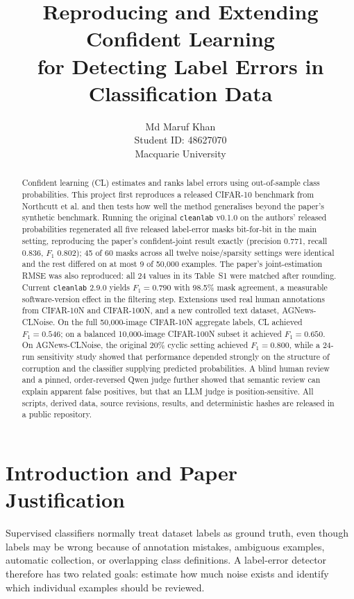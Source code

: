\documentclass[11pt]{article}
\title{Reproducing and Extending Confident Learning\\
for Detecting Label Errors in Classification Data}
\author{
  Md Maruf Khan \\
  Student ID: 48627070 \\
  Macquarie University
}
\newcommand{\cleanlab}{\texttt{cleanlab}}
\begin{document}
\maketitle

\begin{abstract}
Confident learning (CL) estimates and ranks label errors using out-of-sample
class probabilities. This project first reproduces a released CIFAR-10
benchmark from Northcutt et al. and then tests how well the method
generalises beyond the paper's synthetic benchmark. Running the original
\cleanlab{} v0.1.0 on the authors' released probabilities regenerated all
five released label-error masks bit-for-bit in the main setting, reproducing the paper's
confident-joint result exactly (precision 0.771, recall 0.836, $F_1$ 0.802);
45 of 60 masks across all twelve noise/sparsity settings were identical and
the rest differed on at most 9 of 50,000 examples. The paper's
joint-estimation RMSE was also reproduced: all 24 values in its
Table~S1 were matched after rounding. Current \cleanlab{}
2.9.0 yields $F_1=0.790$ with 98.5\% mask agreement, a measurable
software-version effect in the filtering step. Extensions used real human annotations from CIFAR-10N and CIFAR-100N,
and a new controlled text dataset, AGNews-CLNoise. On the full 50,000-image
CIFAR-10N aggregate labels, CL achieved $F_1=0.546$; on a balanced 10,000-image
CIFAR-100N subset it achieved $F_1=0.650$. On AGNews-CLNoise, the original
20\% cyclic setting achieved $F_1=0.800$, while a 24-run sensitivity study
showed that performance depended strongly on the structure of corruption and
the classifier supplying predicted probabilities. A blind human review and a
pinned, order-reversed Qwen judge further showed that semantic review can
explain apparent false positives, but that an LLM judge is position-sensitive.
All scripts, derived data, source revisions, results, and deterministic hashes
are released in a public repository.
\end{abstract}

\section{Introduction and Paper Justification}

Supervised classifiers normally treat dataset labels as ground truth, even
though labels may be wrong because of annotation mistakes, ambiguous examples,
automatic collection, or overlapping class definitions. A label-error detector
therefore has two related goals: estimate how much noise exists and identify
which individual examples should be reviewed.
\end{document}
